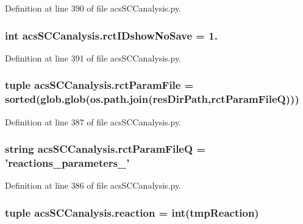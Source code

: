Definition at line 390 of file acs\+S\+C\+Canalysis.\+py.

\hypertarget{a00130_a3942b0b71d5893c244f7f49929db336b}{
\subsubsection[{rct\+I\+Dshow\+No\+Save}]{\setlength{\rightskip}{0pt plus 5cm}int acs\+S\+C\+Canalysis.\+rct\+I\+Dshow\+No\+Save = 1.}}\label{a00130_a3942b0b71d5893c244f7f49929db336b}


Definition at line 391 of file acs\+S\+C\+Canalysis.\+py.

\hypertarget{a00130_ac700504fc38d7684ec9fae104d7d90a3}{
\subsubsection[{rct\+Param\+File}]{\setlength{\rightskip}{0pt plus 5cm}tuple acs\+S\+C\+Canalysis.\+rct\+Param\+File = sorted(glob.\+glob(os.\+path.\+join({\bf res\+Dir\+Path},{\bf rct\+Param\+File\+Q})))}}\label{a00130_ac700504fc38d7684ec9fae104d7d90a3}


Definition at line 387 of file acs\+S\+C\+Canalysis.\+py.

\hypertarget{a00130_aff5ea475bb2c78122a231a915dc88e89}{
\subsubsection[{rct\+Param\+File\+Q}]{\setlength{\rightskip}{0pt plus 5cm}string acs\+S\+C\+Canalysis.\+rct\+Param\+File\+Q = 'reactions\+\_\+parameters\+\_\+'}}\label{a00130_aff5ea475bb2c78122a231a915dc88e89}


Definition at line 386 of file acs\+S\+C\+Canalysis.\+py.

\hypertarget{a00130_a58c3618ec28f27dfbf09e0d3aba05bc7}{
\subsubsection[{reaction}]{\setlength{\rightskip}{0pt plus 5cm}tuple acs\+S\+C\+Canalysis.\+reaction = int(tmp\+Reaction)}}\label{a00130_a58c3618ec28f27dfbf09e0d3aba05bc7}



